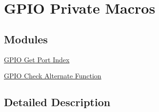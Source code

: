\hypertarget{group___g_p_i_o_ex___private___macros}{}\section{G\+P\+IO Private Macros}
\label{group___g_p_i_o_ex___private___macros}
\subsection*{Modules}
\begin{DoxyCompactItemize}
\item 
\hyperlink{group___g_p_i_o_ex___get___port___index}{G\+P\+I\+O Get Port Index}
\item 
\hyperlink{group___g_p_i_o_ex___i_s___alternat__function__selection}{G\+P\+I\+O Check Alternate Function}
\end{DoxyCompactItemize}


\subsection{Detailed Description}
